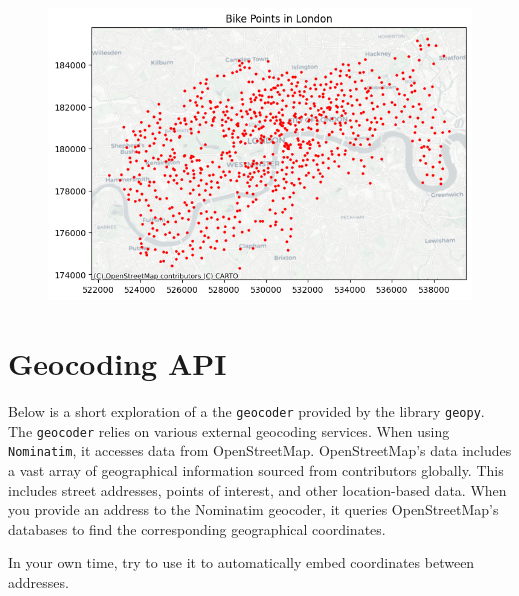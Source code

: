 \documentclass[
  letterpaper,
  DIV=11,
  numbers=noendperiod]{scrreprt}
\begin{document}
\begin{figure}[H]

{\centering \includegraphics{labs/w03_webArch_files/figure-pdf/cell-16-output-2.png}

}

\end{figure}

\hypertarget{geocoding-api}{%
\section{Geocoding API}\label{geocoding-api}}

Below is a short exploration of a the \texttt{geocoder} provided by the
library \texttt{geopy}. The \texttt{geocoder} relies on various external
geocoding services. When using \texttt{Nominatim}, it accesses data from
OpenStreetMap. OpenStreetMap's data includes a vast array of
geographical information sourced from contributors globally. This
includes street addresses, points of interest, and other location-based
data. When you provide an address to the Nominatim geocoder, it queries
OpenStreetMap's databases to find the corresponding geographical
coordinates.

In your own time, try to use it to automatically embed coordinates
between addresses.
\end{document}
